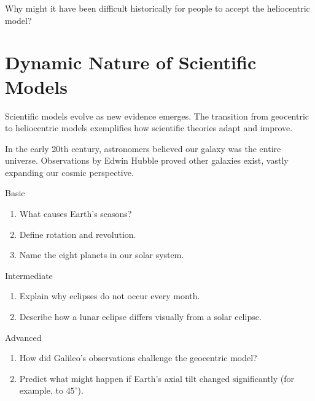 
\begin{stopandthink}
Why might it have been difficult historically for people to accept the heliocentric model?
\end{stopandthink}

\section{Dynamic Nature of Scientific Models}

Scientific models evolve as new evidence emerges. The transition from geocentric to heliocentric models exemplifies how scientific theories adapt and improve.

\begin{example}
In the early 20th century, astronomers believed our galaxy was the entire universe. Observations by Edwin Hubble proved other galaxies exist, vastly expanding our cosmic perspective.
\end{example}


\begin{tieredquestions}{Basic}
\begin{enumerate}
    \item What causes Earth's seasons?
    \item Define rotation and revolution.
    \item Name the eight planets in our solar system.
\end{enumerate}
\end{tieredquestions}

\begin{tieredquestions}{Intermediate}
\begin{enumerate}
    \item Explain why eclipses do not occur every month.
    \item Describe how a lunar eclipse differs visually from a solar eclipse.
\end{enumerate}
\end{tieredquestions}

\begin{tieredquestions}{Advanced}
\begin{enumerate}
    \item How did Galileo's observations challenge the geocentric model?
    \item Predict what might happen if Earth's axial tilt changed significantly (for example, to \(45^\circ\)).
\end{enumerate}
\end{tieredquestions}


